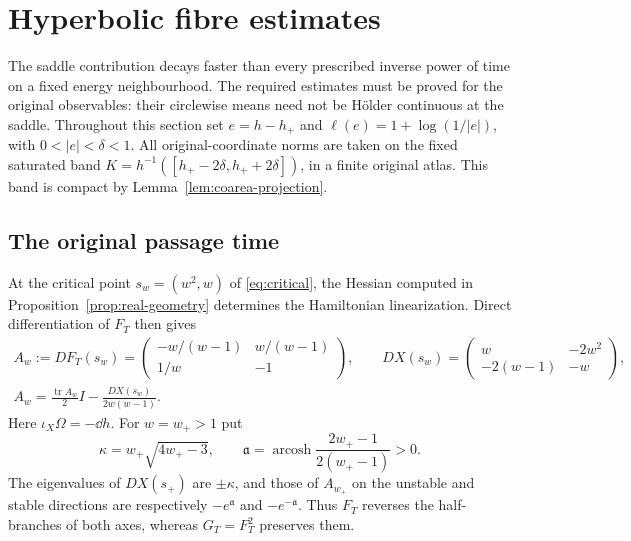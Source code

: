 \section{Hyperbolic fibre estimates}\label{sec:hyperbolic}

The saddle contribution decays faster than every prescribed inverse power
of time on a fixed energy neighbourhood.  The required estimates must be
proved for the original observables: their circlewise means need not be
H\"older continuous at the saddle.  Throughout this section set
$e=h-h_+$ and $\ell(e)=1+\log(1/|e|)$, with $0<|e|<\delta<1$.
All original-coordinate norms are taken on the fixed saturated band
$K=h^{-1}([h_+-2\delta,h_++2\delta])$, in a finite original atlas.
This band is compact by Lemma~\ref{lem:coarea-projection}.

\subsection{The original passage time}

At the critical point $s_w=(w^2,w)$ of \eqref{eq:critical}, the Hessian
computed in Proposition~\ref{prop:real-geometry} determines the
Hamiltonian linearization.  Direct differentiation of $F_T$ then gives
\begin{equation}\label{hyp:linearization}
\begin{gathered}
 A_w:=DF_T(s_w)=
 \begin{pmatrix}-w/(w-1)&w/(w-1)\\1/w&-1\end{pmatrix},
 \qquad
 DX(s_w)=\begin{pmatrix}w&-2w^2\\-2(w-1)&-w\end{pmatrix},\\
 A_w=\frac{\operatorname{tr}A_w}{2}I-
       \frac{DX(s_w)}{2w(w-1)}.
\end{gathered}
\end{equation}
Here $\iota_X\Omega=-\dd h$.  For $w=w_+>1$ put
\[
 \kappa=w_+\sqrt{4w_+-3},\qquad
 \mathfrak a=\operatorname{arcosh}
       \frac{2w_+-1}{2(w_+-1)}>0.
\]
The eigenvalues of $DX(s_+)$ are $\pm\kappa$, and those of $A_{w_+}$
on the unstable and stable directions are respectively
$-e^{\mathfrak a}$ and $-e^{-\mathfrak a}$.  Thus $F_T$ reverses the
half-branches of both axes, whereas $G_T=F_T^2$ preserves them.

